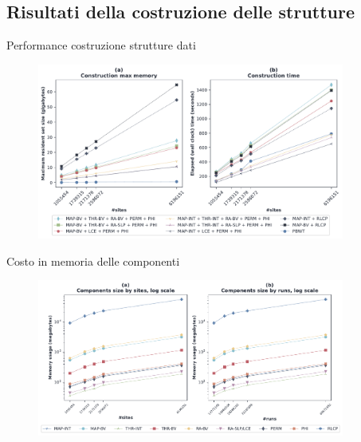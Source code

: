 \documentclass[]{beamer}
\begin{document}
\subsection{Risultati della costruzione delle strutture}
\begin{frame}{Performance costruzione strutture dati}
  \begin{figure}[H]
    \centering
    \includegraphics[width=0.9\textwidth]{img/make_time_mem_paper.pdf}
  \end{figure}
\end{frame}
\begin{frame}{Costo in memoria delle componenti}
  \begin{figure}[H]
    \centering
    \includegraphics[width=0.9\textwidth]{img/comp_mem.pdf}
  \end{figure}
\end{frame}
\end{document}
